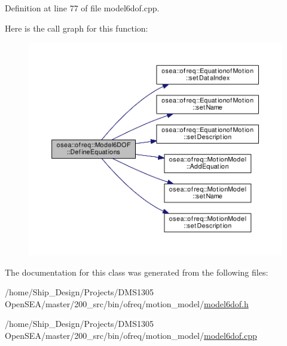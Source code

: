 Definition at line 77 of file model6dof.\-cpp.



Here is the call graph for this function\-:\nopagebreak
\begin{figure}[H]
\begin{center}
\leavevmode
\includegraphics[width=350pt]{classosea_1_1ofreq_1_1_model6_d_o_f_a0048de3d40838c93e2130ebb5130f3a1_cgraph}
\end{center}
\end{figure}




The documentation for this class was generated from the following files\-:\begin{DoxyCompactItemize}
\item 
/home/\-Ship\-\_\-\-Design/\-Projects/\-D\-M\-S1305 Open\-S\-E\-A/master/200\-\_\-src/bin/ofreq/motion\-\_\-model/\hyperlink{model6dof_8h}{model6dof.\-h}\item 
/home/\-Ship\-\_\-\-Design/\-Projects/\-D\-M\-S1305 Open\-S\-E\-A/master/200\-\_\-src/bin/ofreq/motion\-\_\-model/\hyperlink{model6dof_8cpp}{model6dof.\-cpp}\end{DoxyCompactItemize}

